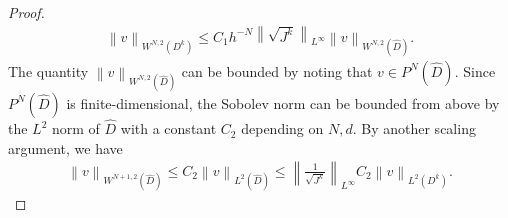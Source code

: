 \documentclass[10pt]{amsart}
\theoremstyle{definition}
\theoremstyle{lemma}
\theoremstyle{theorem}
\theoremstyle{assumption}
\renewcommand{\hat}{\widehat}
\newcommand{\nor}[1]{\left\| #1 \right\|}
\newcommand{\LRp}[1]{\left( #1 \right)}
\begin{document}
{\begin{proof}
\begin{align}
\nor{v}_{W^{N,2}\LRp{D^k}}  \leq C_1 h^{-N} \nor{\sqrt{J^k}}_{L^{\infty}} \nor{v}_{W^{N,2}\LRp{\hat{D}}}.  
\end{align}
The quantity $\nor{v}_{W^{N,2}\LRp{\hat{D}}}$ can be bounded by noting that $v\in P^N\LRp{\hat{D}}$.  Since $P^N\LRp{\hat{D}}$ is finite-dimensional, the Sobolev norm can be bounded from above by the $L^2$ norm of $\hat{D}$ with a constant $C_{2}$ depending on $N, d$.  By another scaling argument, we have 
\begin{align}
\nor{v}_{W^{N+1,2}\LRp{\hat{D}}} \leq C_{2} \nor{v}_{L^2\LRp{\hat{D}}} \leq \nor{\frac{1}{\sqrt{J^k}}}_{L^{\infty}} C_{2}  \nor{v}_{L^2\LRp{D^k}}.
\end{align}
\end{proof}

}
\end{document}
